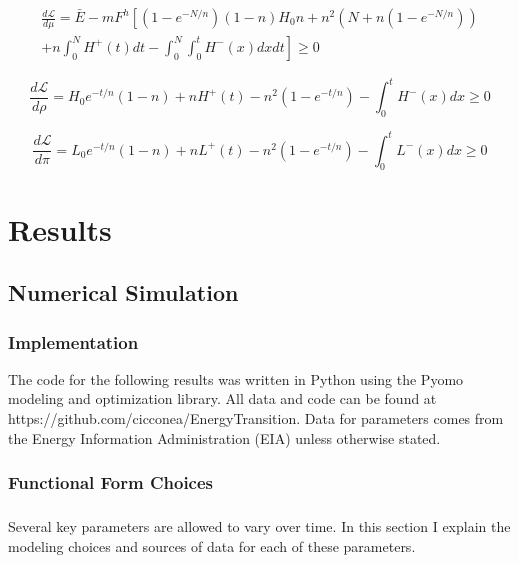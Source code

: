\documentclass{easychithesis}
\newcommand{\Lagr}{\mathcal{L}}
\begin{document}
\begin{multline}\label{eq:dLdmu}
\frac{d\Lagr}{d\mu} = \bar{E} - mF^h \left [(1-e^{-N/n})(1-n)H_0 n + n^2(N + n(1-e^{-N/n})) \right.\\ + \left. n\int_0^N H^+(t) dt - \int_0^N\int_0^t H^-(x)dx dt   \right] \geq 0
\end{multline}

\begin{equation}\label{eq:dLdrho}
\frac{d\Lagr}{d\rho} = H_0 e^{-t/n}(1-n) + nH^+(t) - n^2(1-e^{-t/n}) - \int_0^t H^-(x)dx \geq 0 
\end{equation}

\begin{equation}\label{eq:dLdpi}
\frac{d\Lagr}{d\pi} = L_0 e^{-t/n}(1-n) + nL^+(t) - n^2(1-e^{-t/n}) - \int_0^t L^-(x)dx \geq 0 
\end{equation}





\chapter{Results}
\section{Numerical Simulation}

\subsection{Implementation}
The code for the following results was written in Python using the Pyomo modeling and optimization library. All data and code can be found at \\ https://github.com/cicconea/EnergyTransition. Data for parameters comes from the Energy Information Administration (EIA) unless otherwise stated.  

\subsection{Functional Form Choices}

\paragraph{} Several key parameters are allowed to vary over time. In this section I explain the modeling choices and sources of data for each of these parameters. 
\end{document}
